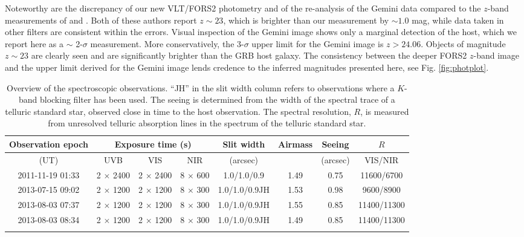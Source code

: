 \documentclass[longauth]{aa}    %
\begin{document}
Noteworthy are the discrepancy of  our new VLT/FORS2 photometry and of the
re-analysis of the Gemini data compared to the $z$-band measurements of
\citet{Margutti2012} and \citet{Sakamoto2013}. Both of these authors report $z
\sim 23$, which is brighter than our measurement by $\sim 1.0$ mag, while data
taken in other filters are consistent within the errors. Visual inspection of
the Gemini image shows only a marginal detection of the host, which we report
here as a $\sim$ 2-$\sigma$ measurement. More conservatively, the 3-$\sigma$
upper limit for the Gemini image is $z > 24.06$. Objects of magnitude $z \sim
23$ are clearly seen and are significantly brighter than the GRB host galaxy.
The consistency between the deeper FORS2 $z$-band image and the upper limit
derived for the Gemini image lends credence to the inferred magnitudes presented
here, see Fig. \ref{fig:photplot}.

\begin{table}
	
	\centering
	\caption{Overview of the spectroscopic observations. ``JH'' in the slit width column refers to observations where a $K$-band blocking filter has been used. The seeing is determined from the width of the spectral trace of a telluric standard star, observed close in time to the host observation. The spectral resolution, $R$, is measured from unresolved telluric absorption lines in the spectrum of the telluric standard star. \label{tab:spec_overview}}
	\begin{tabular}{cccccccc}
		\hline\hline
		{Observation epoch} &  \multicolumn{3}{c}{Exposure time (s)} & Slit width & Airmass & Seeing & $R$   \\ [1.5pt]
		\hline
		(UT) & UVB  & VIS & NIR &  (arcsec)   & {} & (arcsec)  & {VIS/NIR}  \\ [1.5pt]
		\hline
		2011-11-19 01:33 & 2 $\times$ 2400 & 2 $\times$ 2400 & 8 $\times$ 600 & 1.0/1.0/0.9 & 1.49 & 0.75 & 11600/6700 \\
		2013-07-15 09:02 & 2 $\times$ 1200 & 2 $\times$ 1200 & 8 $\times$ 300 & 1.0/1.0/0.9JH & 1.53 & 0.98 & 9600/8900 \\
		2013-08-03 07:37 & 2 $\times$ 1200 & 2 $\times$ 1200 & 8 $\times$ 300 & 1.0/1.0/0.9JH & 1.55 & 0.85 & 11400/11300 \\
		2013-08-03 08:34 & 2 $\times$ 1200 & 2 $\times$ 1200 & 8 $\times$ 300 & 1.0/1.0/0.9JH & 1.49 & 0.85 & 11400/11300 \\
		
		\hline\noalign{\smallskip}
		
	\end{tabular}
	
\end{table}
\end{document}
